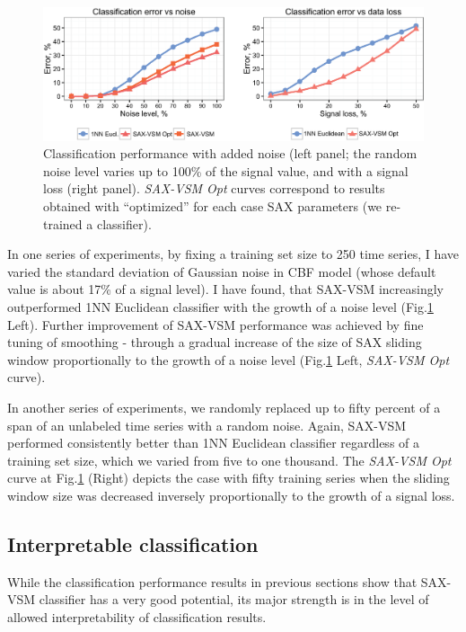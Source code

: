 \begin{figure}[t]
  \centering
  \includegraphics[width=130mm]{figures/corrupted.eps}
  \caption{Classification performance with added noise
  (left panel; the random noise level varies up to 100\% of the signal value,
  and with a signal loss (right panel). \textit{SAX-VSM Opt} curves correspond to 
  results obtained with ``optimized'' for each case SAX parameters 
  (we re-trained a classifier).}
  \label{fig:corrupted}
\end{figure}

In one series of experiments, by fixing a training set size to 250 time series, I have varied the standard deviation 
of Gaussian noise in CBF model (whose default value is about 17\% of a signal level). 
I have found, that SAX-VSM increasingly outperformed 1NN Euclidean classifier with the growth of a noise level 
(Fig.\ref{fig:corrupted} Left). 
Further improvement of SAX-VSM performance was achieved by fine tuning of smoothing - 
through a gradual increase of the size of SAX sliding window proportionally to the growth of 
a noise level (Fig.\ref{fig:corrupted} Left, \textit{SAX-VSM Opt} curve). 

In another series of experiments, we randomly replaced up to fifty percent of a span of an 
unlabeled time series with a random noise. 
Again, SAX-VSM performed consistently better than 1NN Euclidean classifier regardless of a 
training set size, which we varied from five to one thousand. 
The \textit{SAX-VSM Opt} curve at Fig.\ref{fig:corrupted} (Right) depicts the case
with fifty training series when the sliding window size was decreased inversely proportionally 
to the growth of a signal loss.

\subsection{Interpretable classification}
While the classification performance results in previous sections show that SAX-VSM 
classifier has a very good potential, its major strength is in the level of allowed 
interpretability of classification results. 

